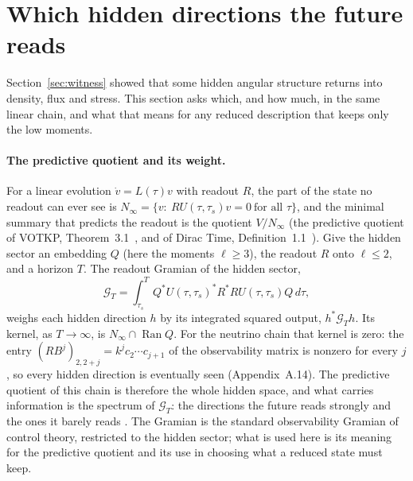 \section{Which hidden directions the future reads}\label{sec:gramian}

Section~\ref{sec:witness} showed that some hidden angular structure returns into density, flux and stress. This section asks which, and how much, in the same linear chain, and what that means for any reduced description that keeps only the low moments.

\paragraph{The predictive quotient and its weight.} For a linear evolution $\dot v=L(\tau)v$ with readout $R$, the part of the state no readout can ever see is $N_\infty=\{v:\ RU(\tau,\tau_s)v=0\ \text{for all }\tau\}$, and the minimal summary that predicts the readout is the quotient $V/N_\infty$ (the predictive quotient of VOTKP, Theorem~3.1~\cite{VOTKP}, and of Dirac Time, Definition~1.1~\cite{DT}). Give the hidden sector an embedding $Q$ (here the moments $\ell\ge3$), the readout $R$ onto $\ell\le2$, and a horizon $T$. The readout Gramian of the hidden sector,
\begin{equation}
\mathcal G_{T}=\int_{\tau_s}^{T}Q^{\ast}U(\tau,\tau_s)^{\ast}R^{\ast}RU(\tau,\tau_s)Q\,d\tau,
\end{equation}
weighs each hidden direction $h$ by its integrated squared output, $h^\ast\mathcal G_Th$. Its kernel, as $T\to\infty$, is $N_\infty\cap\operatorname{Ran}Q$. For the neutrino chain that kernel is zero: the entry $(RB^j)_{2,2+j}=k^jc_2\cdots c_{j+1}$ of the observability matrix is nonzero for every $j$, so every hidden direction is eventually seen (Appendix~A.14). The predictive quotient of this chain is therefore the whole hidden space, and what carries information is the spectrum of $\mathcal G_T$: the directions the future reads strongly and the ones it barely reads . The Gramian is the standard observability Gramian of control theory, restricted to the hidden sector; what is used here is its meaning for the predictive quotient and its use in choosing what a reduced state must keep.

